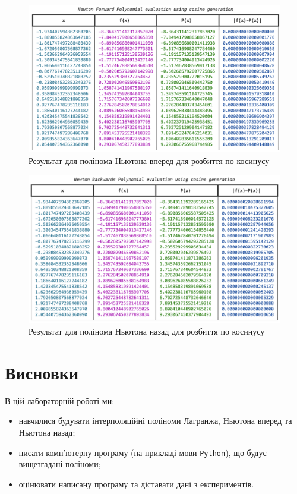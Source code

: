 \documentclass[12pt]{extarticle}
\begin{document}
\begin{figure}[H]
    \centering
    \includegraphics[width=\textwidth]{images/lab_1/newton_forw_cosine.png}
    \caption{Результат для полінома Ньютона вперед для розбиття по косинусу}
    \label{fig:6}
\end{figure}
\vspace{5px}

\begin{figure}[H]
    \centering
    \includegraphics[width=\textwidth]{images/lab_1/newton_back_cosine.png}
    \caption{Результат для полінома Ньютона назад для розбиття по косинусу}
    \label{fig:6}
\end{figure}
\vspace{5px}

\section{Висновки}

В цій лабораторній роботі ми:
\begin{itemize}
\item навчилися будувати інтерполяційні поліноми Лагранжа, Ньютона вперед та Ньютона назад;
\item писати комп'ютерну програму (на прикладі мови \texttt{Python}), що будує вищезгадані поліноми;
\item оцінювати написану програму та діставати дані з експериментів.
\end{itemize}
\end{document}

